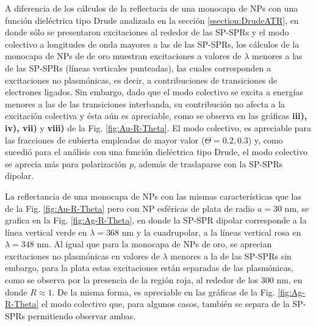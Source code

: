 A diferencia de los cálculos de la reflectacia de una monocapa de NPs  con una función dieléctrica tipo Drude analizada en la sección \ref{ssection:DrudeATR}, en donde sólo se presentaron excitaciones al rededor de las SP-SPRs y el modo colectivo a longitudes de onda mayores a las de las SP-SPRs, los cálculos de la monocapa de NPs de de oro muestran excitaciones a valores de $\lambda$ menores a las de las SP-SPRs (líneas verticales punteadas), las cuales corresponden a excitaciones no plasmónicas, es decir, a contribuciones de transiciones de electrones ligados. Sin embargo, dado que el modo colectivo se excita a energías menores a las de las transiciones interbanda, su contribución no afecta a la excitación colectiva y ésta aún es apreciable, como se observa en las gráficas \textbf{iii), iv), vii)} y \textbf{viii)} de la Fig. \ref{fig:Au-R-Theta}. El modo colectivo, es apreciable para las fracciones de cubierta empleadas de mayor valor ($\Theta = 0.2, 0.3$) y, como sucedió para el análisis con una función dieléctrica tipo Drude, el modo colectivo se aprecia más para polarización \emph{p}, además de traslaparse con la SP-SPRs dipolar.

La reflectancia de una monocapa de NPs con las mismas características que las de la Fig. \ref{fig:Au-R-Theta} pero con NP esféricas de plata de radio $a=30$ nm, se grafica en la Fig. \ref{fig:Ag-R-Theta}, en donde la SP-SPR dipolar corresponde a la línea vertical verde en $\lambda=368$ nm y la cuadrupolar, a la líneas vertical rosa en $\lambda=348$ nm. Al igual que para la monocapa de NPs de oro, se aprecian excitaciones no plasmónicas en valores de $\lambda$ menores a la de las SP-SPRs sin embargo, para la plata estas excitaciones están separadas de las plasmónicas, como se observa por la presencia de la región roja, al rededor de los $300$ nm,  en donde $R\approx 1$. De la misma forma, es apreciable en las gráficas de la Fig. \ref{fig:Ag-R-Theta} el modo colectivo que, para algunos casos, también se separa de la SP-SPRs permitiendo observar ambas.

